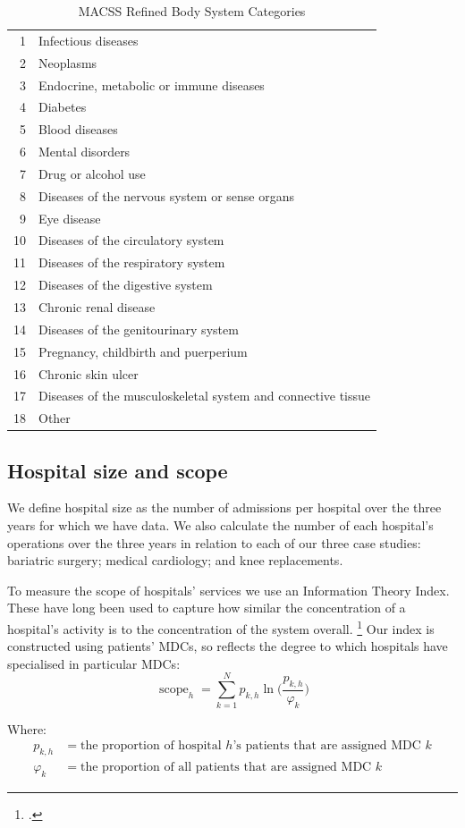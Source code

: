 \documentclass[submission]{grattan}
\begin{document}
\begin{table}
\caption{MACSS Refined Body System Categories}\label{tbl:MACSS-refined-body-systems-categories}
\begin{tabularx}{\linewidth}{rX}
\toprule
1 & Infectious diseases\tabularnewline
2 & Neoplasms\tabularnewline
3 & Endocrine, metabolic or immune diseases\tabularnewline
4 & Diabetes\tabularnewline
5 & Blood diseases\tabularnewline
6 & Mental disorders\tabularnewline
7 & Drug or alcohol use\tabularnewline
8 & Diseases of the nervous system or sense organs\tabularnewline
9 & Eye disease\tabularnewline
10 & Diseases of the circulatory system\tabularnewline
11 & Diseases of the respiratory system\tabularnewline
12 & Diseases of the digestive system\tabularnewline
13 & Chronic renal disease\tabularnewline
14 & Diseases of the genitourinary system\tabularnewline
15 & Pregnancy, childbirth and puerperium\tabularnewline
16 & Chronic skin ulcer\tabularnewline
17 & Diseases of the musculoskeletal system and connective tissue\tabularnewline
18 & Other\tabularnewline
\bottomrule
\end{tabularx}
\end{table}

\subsection{Hospital size and scope}\label{subsec:hospital-size-and-scope}

We define hospital size as the number of admissions per hospital over the three years for which we have data.
We also calculate the number of each hospital's operations over the three years in relation to each of our three case studies: bariatric surgery; medical cardiology; and knee replacements.

To measure the scope of hospitals' services we use an Information Theory Index.
These have long been used to capture how similar the concentration of a hospital's activity is to the concentration of the system overall.%
	\footcite{Kobel-Theurl-2013-Hospital-specialisation-Austria}
Our index is constructed using patients' MDCs, so reflects the degree to which hospitals have specialised in particular MDCs:
\[\operatorname{scope}_{h} = \sum_{k = 1}^{N}{p_{k,h}\ln\biggl(\frac{p_{k,h}}{\varphi_{k}} \biggr)}\]

Where:
\begin{align*}
  p_{k,h} &=\text{the proportion of hospital \(h\)'s patients that are assigned MDC~\(k\)} \\
  \varphi_{k} &=\text{the proportion of all patients that are assigned MDC \(k\)}
\end{align*}
\end{document}
